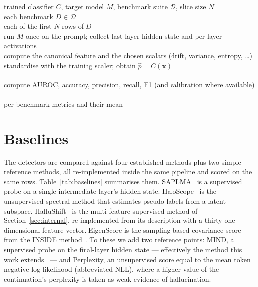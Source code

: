 \begin{algorithm}[h]
\caption{Single-pass feature extraction and multi-task evaluation}
\label{alg:eval}
\begin{algbody}
 trained classifier $C$, target model $M$, benchmark suite $\mathcal{D}$, slice size $N$\\
 each benchmark $D \in \mathcal{D}$ \\
\alin {} each of the first $N$ rows of $D$ \\
\alinn run $M$ once on the prompt; collect last-layer hidden state and per-layer activations\\
\alinn compute the canonical feature and the chosen scalars (drift, variance, entropy, \dots)\\
\alinn standardise with the training scaler; obtain $\hat{p}=C(\mathbf{x})$\\
\alin {}\\
\alin compute AUROC, accuracy, precision, recall, F1 (and calibration where available)\\
\\
 per-benchmark metrics and their mean
\end{algbody}
\end{algorithm}

\section{Baselines}
\label{sec:baselines}

The detectors are compared against four established methods plus two simple reference
methods, all re-implemented inside the same pipeline and scored on the same rows.
Table~\ref{tab:baselines} summarises them. SAPLMA~\cite{azaria2023saplma} is a supervised
probe on a single intermediate layer's hidden state. HaloScope~\cite{du2024haloscope} is
the unsupervised spectral method that estimates pseudo-labels from a latent subspace.
HalluShift~\cite{dasgupta2025hallushift} is the multi-feature supervised method of
Section~\ref{sec:internal}, re-implemented from its description with a thirty-one
dimensional feature vector. EigenScore is the sampling-based covariance score from the
INSIDE method~\cite{chen2024inside}. To these we add two reference points: MIND, a
supervised probe on the final-layer hidden state --- effectively the method this work
extends~\cite{su2024mind} --- and Perplexity, an unsupervised score equal to the mean
token negative log-likelihood (abbreviated NLL), where a higher value of the continuation's
perplexity is taken as weak evidence of hallucination.

